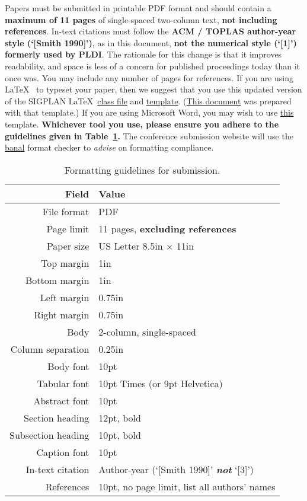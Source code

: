 Papers must be submitted in printable PDF format and should contain a
\textbf{maximum of 11 pages} of single-spaced two-column text,
\textbf{not including references}.  In-text citations must follow the
\textbf{ACM / TOPLAS author-year style (`[Smith 1990]')}, as in this
document, \textbf{not the numerical style (`[1]') formerly used by
  PLDI}.  The rationale for this change is that it improves
readability, and space is less of a concern for published proceedings
today than it once was.  You may include any number of pages for
references.  If you are using
\LaTeX~ to typeset your paper, then we suggest that
you use this updated version of the SIGPLAN 
\LaTeX~\href{http://conf.researchr.org/getImage/pldi2015/orig/sigplanconf.cls}{class
  file} and
\href{http://conf.researchr.org/getImage/pldi2015/orig/pldi15-template.tex}{template}.
(\href{http://conf.researchr.org/getImage/pldi2015/orig/pldi15-template.pdf}{This
  document} was prepared with that template.)  If you are using
Microsoft Word, you may wish to use
\href{http://conf.researchr.org/getImage/pldi2015/orig/pldi15-word-template.dot}{this}
template.  \textbf{Whichever tool you use, please ensure you adhere to the
guidelines given in Table~\ref{table:formatting}.}  The conference
submission website will use the
\href{https://www.usenix.org/legacy/event/wowcs08/tech/full_papers/voelker/voelker.pdf}{banal}
format checker to \emph{advise} on formatting compliance.

\begin{table}[t!]
  \centering
{  \sffamily\small %
  \begin{tabular}{rl}
    \textbf{Field} & \textbf{Value}\\
    \hline
    File format & PDF \\
    Page limit & 11 pages, \textbf{excluding references}\\
    Paper size & US Letter 8.5in $\times$ 11in\\
    Top margin & 1in\\
    Bottom margin & 1in\\
    Left margin & 0.75in\\
    Right margin & 0.75in\\
    Body & 2-column, single-spaced\\
    Column separation & 0.25in\\
    Body font & 10pt\\
    Tabular font & 10pt Times (or 9pt Helvetica)\\
    Abstract font & 10pt\\
    Section heading  & 12pt, bold\\
    Subsection heading  & 10pt, bold\\
    Caption font & 10pt\\
    In-text citation & Author-year (`[Smith 1990]' \emph{\textbf{not}} `[3]') \\
    References & 10pt, no page limit, list all authors' names\\
  \end{tabular}
}
  \caption{Formatting guidelines for submission. }
  \label{table:formatting}
\end{table}

